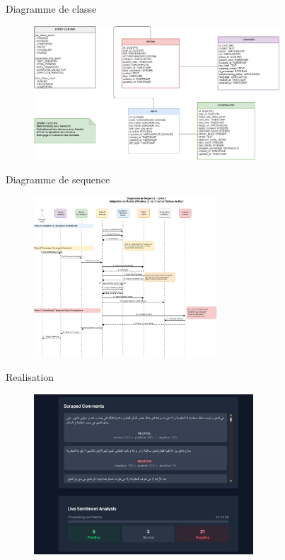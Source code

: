 \begin{frame}{Diagramme de classe}

    \begin{figure}[H]
        \centering
        \includegraphics[height=5cm]{assets/images/sprint2-class.png}
    \end{figure}
\end{frame}


\begin{frame}{Diagramme de sequence}
    \begin{figure}[H]
        \centering
        \includegraphics[height=6cm]{assets/images/sprint3-sequence.png}
    \end{figure}
\end{frame}

\begin{frame}{Realisation}
    \begin{figure}[H]
        \centering
        \includegraphics[height=6cm]{assets/images/report-ui.png}
    \end{figure}
\end{frame}




